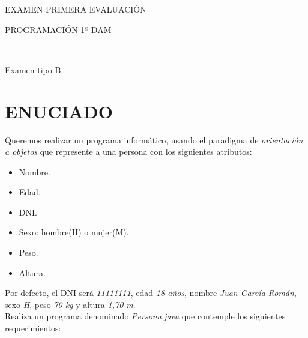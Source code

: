 \documentclass[addpoints]{exam}
\begin{document}
\begin{center}
\begin{Huge}
EXAMEN PRIMERA EVALUACIÓN
\end{Huge}
\vspace{0.06in}

\begin{huge}
PROGRAMACIÓN 1º DAM
\end{huge}\\
\vspace{0.09in}

\begin{LARGE}
Examen tipo B
\end{LARGE}
\vspace{0.1in}

\end{center}
\begin{center}
\end{center}


\vspace{0.1in}
\section{ENUCIADO}
Queremos realizar un programa informático, usando el paradigma de \emph{orientación a objetos} que represente a una persona con los siguientes atributos:
\begin{itemize}
\item Nombre.
\item Edad.
\item DNI.
\item Sexo: hombre(H) o mujer(M).
\item Peso.
\item Altura.
\end{itemize}
Por defecto, el DNI será  \emph{11111111}, edad \emph{18 años}, nombre \emph{Juan García Román}, sexo \emph{H}, peso \emph{70 kg} y altura \emph{1,70 m}.\\ 
Realiza un programa denominado \emph{Persona.java} que contemple los siguientes requerimientos:
\end{document}
